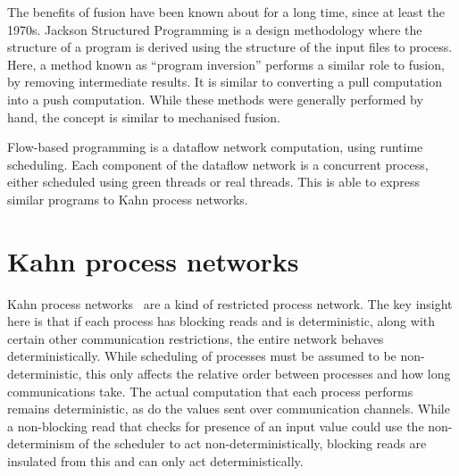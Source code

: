 % 


The benefits of fusion have been known about for a long time, since at least the 1970s.
Jackson Structured Programming \citep{jackson2002jsp} is a design methodology where the structure of a program is derived using the structure of the input files to process.
Here, a method known as ``program inversion'' performs a similar role to fusion, by removing intermediate results.
It is similar to converting a pull computation into a push computation.
While these methods were generally performed by hand, the concept is similar to mechanised fusion.

Flow-based programming \cite{morrison2010flow} is a dataflow network computation, using runtime scheduling.
Each component of the dataflow network is a concurrent process, either scheduled using green threads or real threads.
This is able to express similar programs to Kahn process networks.

\section{Kahn process networks}

Kahn process networks~\citep{kahn1976coroutines} are a kind of restricted process network.
The key insight here is that if each process has blocking reads and is deterministic, along with certain other communication restrictions, the entire network behaves deterministically.
While scheduling of processes must be assumed to be non-deterministic, this only affects the relative order between processes and how long communications take.
The actual computation that each process performs remains deterministic, as do the values sent over communication channels.
While a non-blocking read that checks for presence of an input value could use the non-determinism of the scheduler to act non-deterministically, blocking reads are insulated from this and can only act deterministically.

